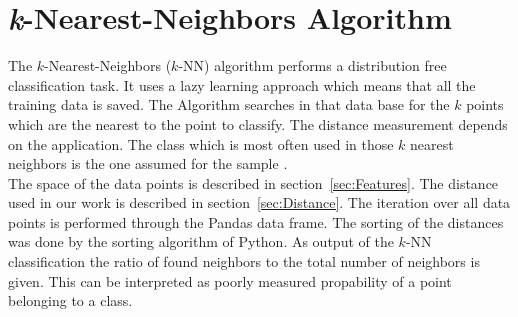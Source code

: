 \section{\textit{k}-Nearest-Neighbors Algorithm}
\label{sec:TheoryKnn}
The $k$-Nearest-Neighbors ($k$-NN) algorithm performs a distribution free classification task. It uses a lazy learning approach which means that all the training data is saved. The Algorithm searches in that data base for the $k$ points which are the nearest to the point to classify. The distance measurement depends on the application. The class which is most often used in those $k$ nearest neighbors is the one assumed for the sample \cite[p.~338~f.]{bib:Alzate2007}.\\
The space of the data points is described in section~\ref{sec:Features}. The distance used in our work is described in section~\ref{sec:Distance}. The iteration over all data points is performed through the Pandas data frame. The sorting of the distances was done by the sorting algorithm of Python. As output of the $k$-NN classification the ratio of found neighbors to the total number of neighbors is given. This can be interpreted as poorly measured propability of a point belonging to a class.
